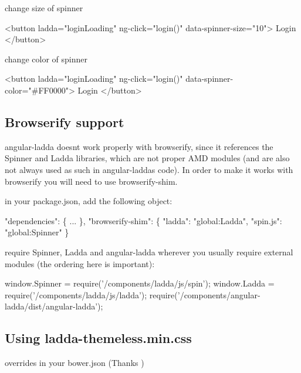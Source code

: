change size of spinner


\begin{DoxyCode}
<button ladda="loginLoading" ng-click="login()" data-spinner-size="10">
  Login
</button>
\end{DoxyCode}


change color of spinner


\begin{DoxyCode}
<button ladda="loginLoading" ng-click="login()" data-spinner-color="#FF0000">
  Login
</button>
\end{DoxyCode}


\subsection*{Browserify support}

angular-\/ladda doesn\textquotesingle{}t work properly with browserify, since it references the Spinner and Ladda libraries, which are not proper A\+MD modules (and are also not always used as such in angular-\/ladda\textquotesingle{}s code). In order to make it works with browserify you will need to use browserify-\/shim.




in your package.\+json, add the following object\+:


\begin{DoxyCode}
"dependencies": \{
    ...
\},
"browserify-shim": \{
    "ladda": "global:Ladda",
    "spin.js": "global:Spinner"
\}
\end{DoxyCode}


require Spinner, Ladda and angular-\/ladda wherever you usually require external modules (the ordering here is important)\+:


\begin{DoxyCode}
window.Spinner = require('/components/ladda/js/spin');
window.Ladda = require('/components/ladda/js/ladda');
require('/components/angular-ladda/dist/angular-ladda');
\end{DoxyCode}


\subsection*{Using ladda-\/themeless.\+min.\+css}

overrides in your {\ttfamily bower.\+json} (Thanks )


